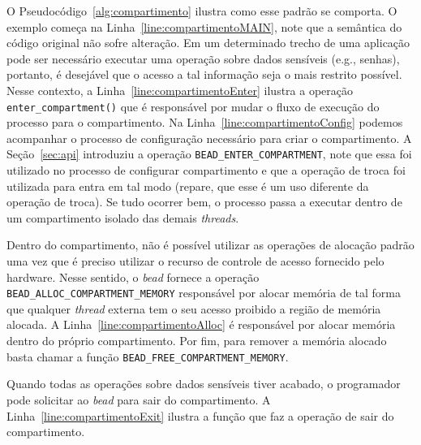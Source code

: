 O Pseudocódigo~\ref{alg:compartimento} ilustra como esse padrão se comporta. O
exemplo começa na Linha~\ref{line:compartimentoMAIN}, note que a semântica do
código original não sofre alteração. Em um determinado trecho de uma aplicação
pode ser necessário executar uma operação sobre dados sensíveis (e.g., senhas),
portanto, é desejável que o acesso a tal informação seja o mais restrito
possível. Nesse contexto, a Linha~\ref{line:compartimentoEnter} ilustra a
operação \texttt{enter\_compartment()} que é responsável por mudar o fluxo de
execução do processo para o compartimento. Na
Linha~\ref{line:compartimentoConfig} podemos acompanhar o processo de
configuração necessário para criar o compartimento. A Seção~\ref{sec:api}
introduziu a operação \texttt{BEAD\_ENTER\_COMPARTMENT}, note que essa foi
utilizado no processo de configurar compartimento e que a operação de troca foi
utilizada para entra em tal modo (repare, que esse é um uso diferente da
operação de troca). Se tudo ocorrer bem, o processo passa a executar dentro de
um compartimento isolado das demais \emph{threads}.

Dentro do compartimento, não é possível utilizar as operações de alocação
padrão uma vez que é preciso utilizar o recurso de controle de acesso fornecido
pelo hardware. Nesse sentido, o \emph{bead} fornece a operação
\texttt{BEAD\_ALLOC\_COMPARTMENT\_MEMORY} responsável por alocar memória de tal
forma que qualquer \emph{thread} externa tem o seu acesso proibido a região de memória
alocada. A Linha~\ref{line:compartimentoAlloc} é responsável por alocar memória
dentro do próprio compartimento. Por fim, para remover a memória alocado basta
chamar a função \texttt{BEAD\_FREE\_COMPARTMENT\_MEMORY}.

Quando todas as operações sobre dados sensíveis tiver acabado, o programador
pode solicitar ao \emph{bead} para sair do compartimento. A
Linha~\ref{line:compartimentoExit} ilustra a função que faz a operação de sair
do compartimento.
